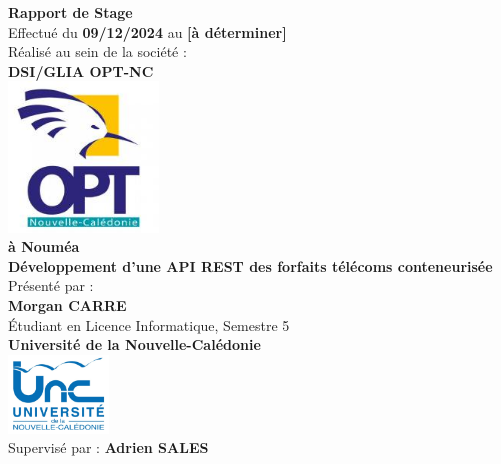 \documentclass{article}
\begin{document}
	
	\begin{titlepage}
		\begin{center}
			{\LARGE \textbf{Rapport de Stage}} \\[1.5cm]
			{\large Effectué du \textbf{09/12/2024} au \textbf{[à déterminer]}} \\[1cm]
			
			
			
			{\large Réalisé au sein de la société :} \\[1cm]
			{\Large \textbf{DSI/GLIA OPT-NC}} \\[1cm]
			
			\includegraphics[width=0.3\textwidth]{asset/logo_opt.jpg} \\[1cm] 
			
			
			\textbf{à Nouméa} \\[1cm]
			
			{\large \textbf{Développement d'une API REST des forfaits télécoms conteneurisée}} \\[1cm]
			
			{\large Présenté par :} \\[1cm]
			{\LARGE \textbf{Morgan CARRE}} \\[0.5cm]
			Étudiant en Licence Informatique, Semestre 5 \\[0.5cm]
			\textbf{Université de la Nouvelle-Calédonie} \\[0.5cm]
			
			\includegraphics[width=0.2\textwidth]{asset/logo_universite.jpg} \\[2cm]
			
			{\large Supervisé par : \textbf{Adrien SALES}} \\[0.5cm]
		\end{center}
	\end{titlepage}
	\newpage
\end{document}
